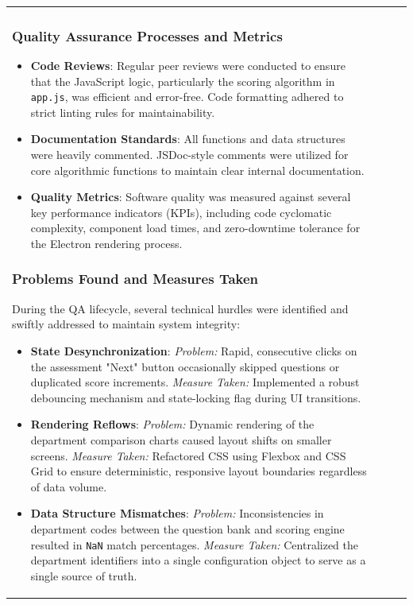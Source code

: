 \documentclass[12pt, a4paper]{article}
\begin{document}
\begin{itemize}[leftmargin=1.5em, itemsep=3pt]
\begin{table}[H]
\begin{tabularx}{\textwidth}{>{\raggedright\arraybackslash}p{0.8cm}>{\raggedright\arraybackslash}p{3.5cm}>{\raggedright\arraybackslash}X>{\raggedright\arraybackslash}p{2.5cm}}
\subsubsection{Quality Assurance Processes and Metrics}
\begin{itemize}[leftmargin=1.5em, itemsep=3pt]
    \item \textbf{Code Reviews}: Regular peer reviews were conducted to ensure that the JavaScript logic, particularly the scoring algorithm in \texttt{app.js}, was efficient and error-free. Code formatting adhered to strict linting rules for maintainability.
    \item \textbf{Documentation Standards}: All functions and data structures were heavily commented. JSDoc-style comments were utilized for core algorithmic functions to maintain clear internal documentation.
    \item \textbf{Quality Metrics}: Software quality was measured against several key performance indicators (KPIs), including code cyclomatic complexity, component load times, and zero-downtime tolerance for the Electron rendering process.
\end{itemize}

\subsubsection{Problems Found and Measures Taken}
During the QA lifecycle, several technical hurdles were identified and swiftly addressed to maintain system integrity:
\begin{itemize}[leftmargin=1.5em, itemsep=3pt]
    \item \textbf{State Desynchronization}: \textit{Problem:} Rapid, consecutive clicks on the assessment "Next" button occasionally skipped questions or duplicated score increments. \textit{Measure Taken:} Implemented a robust debouncing mechanism and state-locking flag during UI transitions.
    \item \textbf{Rendering Reflows}: \textit{Problem:} Dynamic rendering of the department comparison charts caused layout shifts on smaller screens. \textit{Measure Taken:} Refactored CSS using Flexbox and CSS Grid to ensure deterministic, responsive layout boundaries regardless of data volume.
    \item \textbf{Data Structure Mismatches}: \textit{Problem:} Inconsistencies in department codes between the question bank and scoring engine resulted in \texttt{NaN} match percentages. \textit{Measure Taken:} Centralized the department identifiers into a single configuration object to serve as a single source of truth.
\end{itemize}


\end{tabularx}
\end{table}
\end{itemize}
\end{document}
